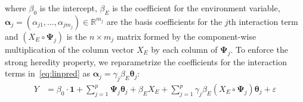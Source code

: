 \documentclass[12pt,letter]{article}\usepackage[]{graphicx}\usepackage[]{color}
\makeatletter
\newcommand{\balpha}{\boldsymbol{\alpha}}
\newcommand{\mb}[1]{\mathbf{#1}}
\newcommand {\bs}{\boldsymbol}
\newcommand{\btheta}{\boldsymbol{\theta}}
\newcommand{\bPsi}{\boldsymbol{\Psi}}
\DeclarePairedDelimiter\norm{\lVert}{\rVert}%
\let\oldnorm\norm
\def\norm{\@ifstar{\oldnorm}{\oldnorm*}}
\makeatother
\begin{document}
where $\beta_0$ is the intercept, $\beta_E$ is the coefficient for the environment variable, $\balpha_j = (\alpha_{j1}, \ldots, \alpha_{jm_j})\in \mathbb{R}^{m_j}$ are the basis coefficients for the $j$th interaction term and $(X_E \circ \bPsi_j)$ is the $n \times m_j$ matrix formed by the component-wise multiplication of the column vector $X_E$ by each column of $\bPsi_j$. To enforce the strong heredity property, we reparametrize the coefficients for the interaction terms in~\eqref{eq:linpred} as $\balpha_{j} = \gamma_{j}  \beta_E \btheta_j$:
\begin{align}
	Y  & =  \beta_0 \cdot \boldsymbol{1} + \sum_{j=1}^p \bPsi_j \btheta_j + \beta_E X_E + \sum_{j=1}^p \gamma_{j}  \beta_E (X_E \circ \bPsi_j) \btheta_j + \varepsilon   \label{eq:linpred2}
\end{align}

\end{document}
